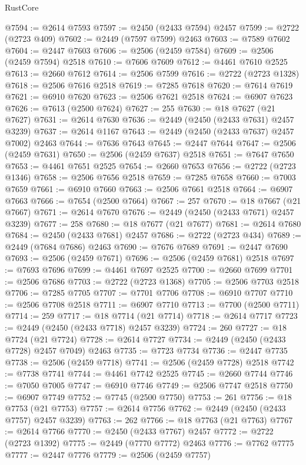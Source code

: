 \begin{lexlean}{RustCore}
\begin{coremodule}
@7594 := @2614 @7593
@7597 := @2450 (@2433 @7594) @2457
@7599 := @2722 (@2723 @409)
@7602 := @2449 (@7597 @7599) @2463
@7603 := @7589 @7602
@7604 := @2447 @7603
@7606 := @2506 (@2459 @7584)
@7609 := @2506 (@2459 @7594) @2518
@7610 := @7606 @7609
@7612 := @4461 @7610 @2525
@7613 := @2660 @7612
@7614 := @2506 @7599
@7616 := @2722 (@2723 @1328)
@7618 := @2506 @7616 @2518
@7619 := @7285 @7618
@7620 := @7614 @7619
@7621 := @6910 @7620
@7623 := @2506 @7621 @2518
@7624 := @6907 @7623
@7626 := @7613 (@2500 @7624)
@7627 := 255
@7630 := @18 @7627 (@21 @7627)
@7631 := @2614 @7630
@7636 := @2449 (@2450 (@2433 @7631) @2457 @3239)
@7637 := @2614 @1167
@7643 := @2449 (@2450 (@2433 @7637) @2457 @7002) @2463
@7644 := @7636 @7643
@7645 := @2447 @7644
@7647 := @2506 (@2459 @7631)
@7650 := @2506 (@2459 @7637) @2518
@7651 := @7647 @7650
@7653 := @4461 @7651 @2525
@7654 := @2660 @7653
@7656 := @2722 (@2723 @1346)
@7658 := @2506 @7656 @2518
@7659 := @7285 @7658
@7660 := @7003 @7659
@7661 := @6910 @7660
@7663 := @2506 @7661 @2518
@7664 := @6907 @7663
@7666 := @7654 (@2500 @7664)
@7667 := 257
@7670 := @18 @7667 (@21 @7667)
@7671 := @2614 @7670
@7676 := @2449 (@2450 (@2433 @7671) @2457 @3239)
@7677 := 258
@7680 := @18 @7677 (@21 @7677)
@7681 := @2614 @7680
@7684 := @2450 (@2433 @7681) @2457
@7686 := @2722 (@2723 @434)
@7689 := @2449 (@7684 @7686) @2463
@7690 := @7676 @7689
@7691 := @2447 @7690
@7693 := @2506 (@2459 @7671)
@7696 := @2506 (@2459 @7681) @2518
@7697 := @7693 @7696
@7699 := @4461 @7697 @2525
@7700 := @2660 @7699
@7701 := @2506 @7686
@7703 := @2722 (@2723 @1368)
@7705 := @2506 @7703 @2518
@7706 := @7285 @7705
@7707 := @7701 @7706
@7708 := @6910 @7707
@7710 := @2506 @7708 @2518
@7711 := @6907 @7710
@7713 := @7700 (@2500 @7711)
@7714 := 259
@7717 := @18 @7714 (@21 @7714)
@7718 := @2614 @7717
@7723 := @2449 (@2450 (@2433 @7718) @2457 @3239)
@7724 := 260
@7727 := @18 @7724 (@21 @7724)
@7728 := @2614 @7727
@7734 := @2449 (@2450 (@2433 @7728) @2457 @7049) @2463
@7735 := @7723 @7734
@7736 := @2447 @7735
@7738 := @2506 (@2459 @7718)
@7741 := @2506 (@2459 @7728) @2518
@7742 := @7738 @7741
@7744 := @4461 @7742 @2525
@7745 := @2660 @7744
@7746 := @7050 @7005
@7747 := @6910 @7746
@7749 := @2506 @7747 @2518
@7750 := @6907 @7749
@7752 := @7745 (@2500 @7750)
@7753 := 261
@7756 := @18 @7753 (@21 @7753)
@7757 := @2614 @7756
@7762 := @2449 (@2450 (@2433 @7757) @2457 @3239)
@7763 := 262
@7766 := @18 @7763 (@21 @7763)
@7767 := @2614 @7766
@7770 := @2450 (@2433 @7767) @2457
@7772 := @2722 (@2723 @1392)
@7775 := @2449 (@7770 @7772) @2463
@7776 := @7762 @7775
@7777 := @2447 @7776
@7779 := @2506 (@2459 @7757)

\end{coremodule}
\end{lexlean}
